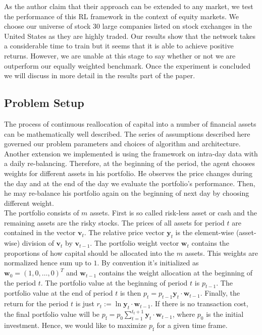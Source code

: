 \documentclass{article}
\begin{document}
As the author claim that their approach can be extended to any market, we test the performance of this RL framework in the context of equity markets. We choose our universe of stock 30 large companies listed on stock exchanges in the United States as they are highly traded. Our results show that the network takes a considerable time to train but it seems that it is able to achieve positive returns. However, we are unable at this stage to say whether or not we are outperform our equally weighted benchmark. Once the experiment is concluded we will discuss in more detail in the results part of the paper.

\subsection{Problem Setup}

The process of continuous reallocation of capital into a number of financial assets can be mathematically well described. The series of assumptions described here governed our problem parameters and choices of algorithm and architecture.\\

Another extension we implemented is using the framework on intra-day data with a daily re-balancing. Therefore, at the beginning of the period, the agent chooses weights for different assets in his portfolio. He observes the price changes during the day and at the end of the day we evaluate the portfolio's performance. Then, he may re-balance his portfolio again on the beginning of next day by choosing different weight.\\

The portfolio consists of $m$ assets. First is so called risk-less asset or cash and the remaining assets are the risky stocks. The prices of all assets for period $t$ are contained in the vector $\bm{v}_t$. The relative price vector $\bm{y}_t$ is the element-wise (asset-wise) division of $\bm{v}_t$ by $\bm{v}_{t-1}$. The portfolio weight vector $\bm{w}_t$ contains the proportions of how capital should be allocated into the $m$ assets. This weights are normalized hence sum up to $1$. By convention it's initialized as $\bm{w}_0 = (1,0,\ldots,0)^T$ and $\bm{w}_{t-1}$ contains the weight allocation at the beginning of the period $t$. The portfolio value at the beginning of period $t$ is $p_{t-1}$. The portfolio value at the end of period $t$ is then $p_t = p_{t-1} \bm{y}_t \cdot \bm{w}_{t-1}$. Finally, the return for the period $t$ is just $r_t := \ln \bm{y}_t \cdot \bm{w}_{t-1}$. If there is no transaction cost, the final portfolio value will be $p_\text{f} = p_0 \sum_{t=1}^{t_\text{f} +1 }\bm{y}_t \cdot \bm{w}_{t-1}$, where $p_0$ is the initial investment. Hence, we would like to maximize $p_\text{f}$ for a given time frame.\\
\end{document}
